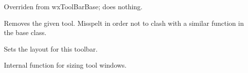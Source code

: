 Overriden from wxToolBarBase; does nothing.


\label{wxdynamictoolbarremvetool}


Removes the given tool. Misspelt in order not to clash with a similar function
in the base class.


\label{wxdynamictoolbarsetlayout}


Sets the layout for this toolbar.


\label{wxdynamictoolbarsizetoolwindows}


Internal function for sizing tool windows.

